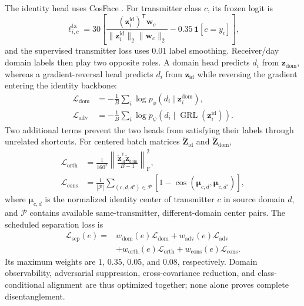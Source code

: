 \documentclass[journal]{IEEEtran}
\begin{document}
The identity head uses CosFace \cite{wang2018cosface}. For transmitter class \(c\), its frozen logit is
\begin{equation}
\ell^{\mathrm{tx}}_{i,c}
=30\left[
\frac{(\mathbf{z}^{\mathrm{id}}_i)^{\mathsf T}\mathbf{w}_c}
{\|\mathbf{z}^{\mathrm{id}}_i\|_2\|\mathbf{w}_c\|_2}
-0.35\,\mathbf{1}[c=y_i]
\right],
\label{eq:p1_cosface}
\end{equation}
and the supervised transmitter loss uses 0.01 label smoothing. Receiver/day domain labels then play two opposite roles. A domain head predicts \(d_i\) from \(\mathbf{z}_{\mathrm{dom}}\), whereas a gradient-reversal head \cite{ganin2016dann} predicts \(d_i\) from \(\mathbf{z}_{\mathrm{id}}\) while reversing the gradient entering the identity backbone:
\begin{align}
\mathcal{L}_{\mathrm{dom}}
&=-\frac{1}{B}\sum_i
\log p_{\phi}(d_i\mid\mathbf{z}^{\mathrm{dom}}_i),\\
\mathcal{L}_{\mathrm{adv}}
&=-\frac{1}{B}\sum_i
\log p_{\psi}\!\left(
d_i\mid\operatorname{GRL}(\mathbf{z}^{\mathrm{id}}_i)\right).
\end{align}
Two additional terms prevent the two heads from satisfying their labels through unrelated shortcuts. For centered batch matrices
\(\widetilde{\mathbf{Z}}_{\mathrm{id}}\) and
\(\widetilde{\mathbf{Z}}_{\mathrm{dom}}\),
\begin{equation}
\begin{aligned}
\mathcal{L}_{\mathrm{orth}}
&=\frac{1}{160^2}
\left\|
\frac{\widetilde{\mathbf{Z}}_{\mathrm{id}}^{\mathsf T}
\widetilde{\mathbf{Z}}_{\mathrm{dom}}}{B-1}
\right\|_{\mathrm{F}}^2,\\
\mathcal{L}_{\mathrm{cons}}
&=\frac{1}{|\mathcal{P}|}
\sum_{(c,d,d')\in\mathcal{P}}
\left[1-\cos(\boldsymbol{\mu}_{c,d},
\boldsymbol{\mu}_{c,d'})\right],
\end{aligned}
\label{eq:p1_allocation}
\end{equation}
where \(\boldsymbol{\mu}_{c,d}\) is the normalized identity center of transmitter \(c\) in source domain \(d\), and \(\mathcal{P}\) contains available same-transmitter, different-domain center pairs. The scheduled separation loss is
\begin{equation}
\begin{aligned}
\mathcal{L}_{\mathrm{sep}}(e)
={}&w_{\mathrm{dom}}(e)\mathcal{L}_{\mathrm{dom}}
+w_{\mathrm{adv}}(e)\mathcal{L}_{\mathrm{adv}}\\
&+w_{\mathrm{orth}}(e)\mathcal{L}_{\mathrm{orth}}
+w_{\mathrm{cons}}(e)\mathcal{L}_{\mathrm{cons}}.
\end{aligned}
\label{eq:p1_separation}
\end{equation}
Its maximum weights are \(1\), \(0.35\), \(0.05\), and \(0.08\), respectively. Domain observability, adversarial suppression, cross-covariance reduction, and class-conditional alignment are thus optimized together; none alone proves complete disentanglement.
\end{document}
